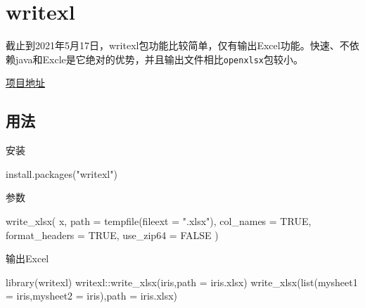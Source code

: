 \documentclass[
]{book}
\newenvironment{Shaded}{\begin{snugshade}}{\end{snugshade}}
\newcommand{\AttributeTok}[1]{\textcolor[rgb]{0.77,0.63,0.00}{#1}}
\newcommand{\ConstantTok}[1]{\textcolor[rgb]{0.00,0.00,0.00}{#1}}
\newcommand{\FunctionTok}[1]{\textcolor[rgb]{0.00,0.00,0.00}{#1}}
\newcommand{\NormalTok}[1]{#1}
\newcommand{\SpecialCharTok}[1]{\textcolor[rgb]{0.00,0.00,0.00}{#1}}
\newcommand{\StringTok}[1]{\textcolor[rgb]{0.31,0.60,0.02}{#1}}
\begin{document}
\hypertarget{writexl}{%
\section{writexl}\label{writexl}}

截止到2021年5月17日，writexl包功能比较简单，仅有输出Excel功能。快速、不依赖java和Excle是它绝对的优势，并且输出文件相比\texttt{openxlsx}包较小。

\href{https://docs.ropensci.org/writexl/}{项目地址}

\hypertarget{writexl:usage}{%
\subsection{用法}\label{writexl:usage}}

安装

\begin{Shaded}
\begin{Highlighting}[]
\FunctionTok{install.packages}\NormalTok{(}\StringTok{"writexl"}\NormalTok{)}
\end{Highlighting}
\end{Shaded}

参数

\begin{Shaded}
\begin{Highlighting}[]
\FunctionTok{write\_xlsx}\NormalTok{(}
\NormalTok{  x,}
  \AttributeTok{path =} \FunctionTok{tempfile}\NormalTok{(}\AttributeTok{fileext =} \StringTok{".xlsx"}\NormalTok{),}
  \AttributeTok{col\_names =} \ConstantTok{TRUE}\NormalTok{,}
  \AttributeTok{format\_headers =} \ConstantTok{TRUE}\NormalTok{,}
  \AttributeTok{use\_zip64 =} \ConstantTok{FALSE}
\NormalTok{)}
\end{Highlighting}
\end{Shaded}

输出Excel

\begin{Shaded}
\begin{Highlighting}[]
\FunctionTok{library}\NormalTok{(writexl)}
\NormalTok{writexl}\SpecialCharTok{::}\FunctionTok{write\_xlsx}\NormalTok{(iris,}\AttributeTok{path =} \StringTok{\textquotesingle{}iris.xlsx\textquotesingle{}}\NormalTok{)}
\FunctionTok{write\_xlsx}\NormalTok{(}\FunctionTok{list}\NormalTok{(}\AttributeTok{mysheet1 =}\NormalTok{ iris,}\AttributeTok{mysheet2 =}\NormalTok{ iris),}\AttributeTok{path =} \StringTok{\textquotesingle{}iris.xlsx\textquotesingle{}}\NormalTok{)}
\end{Highlighting}
\end{Shaded}
\end{document}
